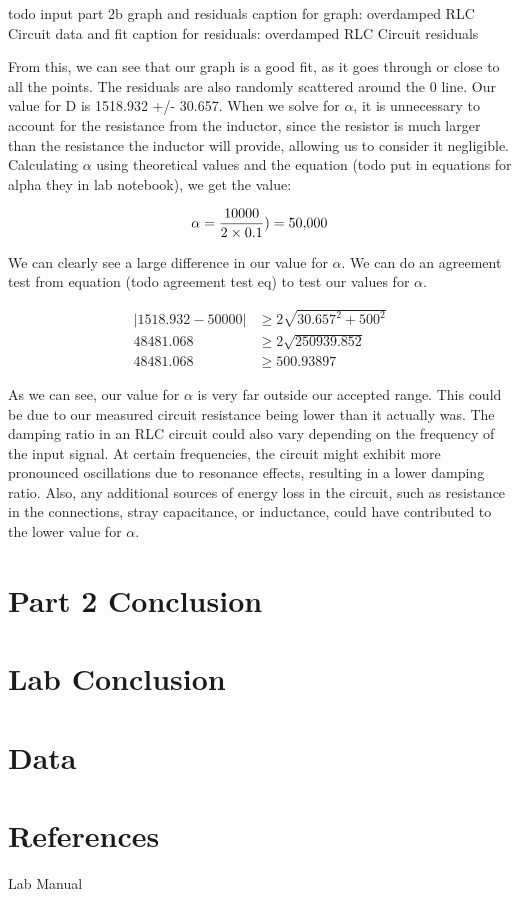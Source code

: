 \documentclass[11pt]{article}
\let\oldsection\section
\renewcommand\section{\clearpage\oldsection}
\begin{document}
    todo input part 2b graph and residuals
    caption for graph: overdamped RLC Circuit data and fit
    caption for residuals: overdamped RLC Circuit residuals

    From this, we can see that our graph is a good fit, as it goes through or close to all the points. The residuals are also randomly scattered around the 0 line. Our value for D is 1518.932 +/- 30.657. When we solve for \( \alpha \), it is unnecessary to account for the resistance from the inductor, since the resistor is much larger than the resistance the inductor will provide, allowing us to consider it negligible. Calculating \( \alpha \) using theoretical values and the equation (todo put in equations for alpha they in lab notebook), we get the value:

    \[
    \alpha = \frac{10000}{2 \times 0.1} \\) = 50{,}000
    \]

    We can clearly see a large difference in our value for \( \alpha \). We can do an agreement test from equation (todo agreement test eq) to test our values for \( \alpha \).

    \begin{e}
        \begin{align*}
            |1518.932 - 50000| &\ge 2 \sqrt{30.657^2 + 500^2} \\
            48481.068 &\ge 2 \sqrt{250939.852} \\
            48481.068 &\ge 500.93897
        \end{align*}
    \end{e}

    As we can see, our value for \( \alpha \) is very far outside our accepted range. This could be due to our measured circuit resistance being lower than it actually was. The damping ratio in an RLC circuit could also vary depending on the frequency of the input signal. At certain frequencies, the circuit might exhibit more pronounced oscillations due to resonance effects, resulting in a lower damping ratio. Also, any additional sources of energy loss in the circuit, such as resistance in the connections, stray capacitance, or inductance, could have contributed to the lower value for \( \alpha \).

    
    \section{Part 2 Conclusion}\label{sec:part2_conclusion}

    \section{Lab Conclusion}\label{sec:conclusion}


    \appendix
    \section{Data}\label{sec:data}

    \section{References}\label{sec:references}

    Lab Manual
\end{document}
